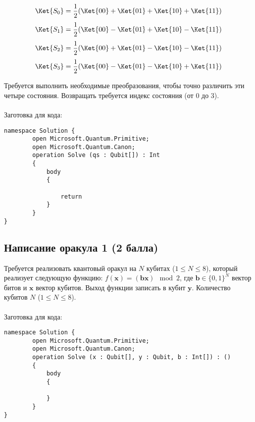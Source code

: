 \documentclass{article}
\begin{document}
$$\Ket{S_0} = \frac{1}{2}(\Ket{00} + \Ket{01} + \Ket{10} + \Ket{11})$$
$$\Ket{S_1} = \frac{1}{2}(\Ket{00} - \Ket{01} + \Ket{10} - \Ket{11})$$
$$\Ket{S_2} = \frac{1}{2}(\Ket{00} + \Ket{01} - \Ket{10} - \Ket{11})$$
$$\Ket{S_3} = \frac{1}{2}(\Ket{00} - \Ket{01} - \Ket{10} + \Ket{11})$$


Требуется выполнить необходимые преобразования, чтобы точно различить эти четыре состояния. Возвращать требуется индекс состояния (от $0$ до $3$). 
\\\\
Заготовка для кода:
\begin{lstlisting}
namespace Solution {
        open Microsoft.Quantum.Primitive;
        open Microsoft.Quantum.Canon;
        operation Solve (qs : Qubit[]) : Int
        {
            body
            {

                return 
            }
        }
}
\end{lstlisting}


\subsection{Написание оракула 1 (2 балла)}

Требуется реализовать квантовый оракул на $N$ кубитах ($1 \le N \le 8$), который реализует следующую функцию: $f(\pmb{x}) = (\pmb{b}\pmb{x}) \mod 2$, где  $\pmb{b} \in \{0,1\}^N$ вектор битов и  $\pmb{x}$ вектор кубитов. Выход функции записать в кубит $\pmb{y}$. Количество кубитов $N$ ($1 \le N \le 8$). 
\\\\
Заготовка для кода:
\begin{lstlisting}
namespace Solution {
        open Microsoft.Quantum.Primitive;
        open Microsoft.Quantum.Canon;
        operation Solve (x : Qubit[], y : Qubit, b : Int[]) : ()
        {
            body
            {

            }
        }
}
\end{lstlisting}
\end{document}
